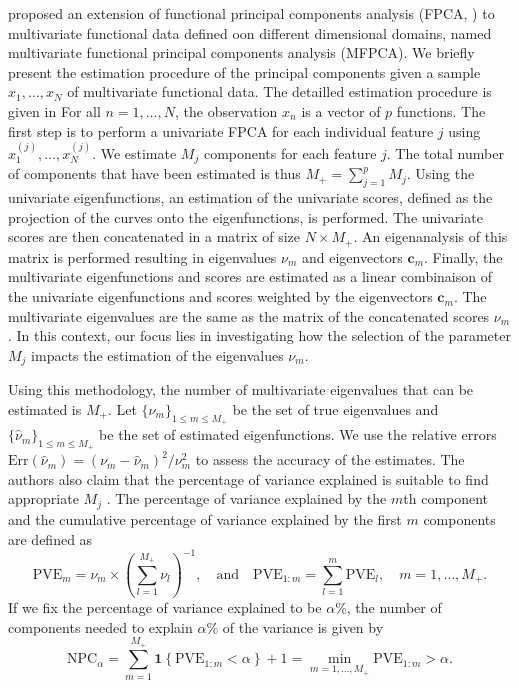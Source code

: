 \cite{happMultivariateFunctionalPrincipal2018} proposed an extension of functional principal components analysis (FPCA, \cite{ramsayFunctionalDataAnalysis2005}) to multivariate functional data defined oon different dimensional domains, named multivariate functional principal components analysis (MFPCA). We briefly present the estimation procedure of the principal components given a sample $x_1, \dots, x_N$ of multivariate functional data. The detailled estimation procedure is given in \cite[Section 3]{happMultivariateFunctionalPrincipal2018} For all $n = 1, \dots, N$, the observation $x_n$ is a vector of $p$ functions. The first step is to perform a univariate FPCA for each individual feature $j$ using $x_1^{(j)}, \dots, x_N^{(j)}$. We estimate $M_j$ components for each feature $j$. The total number of components that have been estimated is thus $M_+ = \sum_{j = 1}^p M_j$. Using the univariate eigenfunctions, an estimation of the univariate scores, defined as the projection of the curves onto the eigenfunctions, is performed. The univariate scores are then concatenated in a matrix of size $N \times M_+$. An eigenanalysis of this matrix is performed resulting in eigenvalues $\nu_m$ and eigenvectors $\mathbf{c}_m$. Finally, the multivariate eigenfunctions and scores are estimated as a linear combinaison of the univariate eigenfunctions and scores weighted by the eigenvectors $\mathbf{c}_m$. The multivariate eigenvalues are the same as the matrix of the concatenated scores $\nu_m$. In this context, our focus lies in investigating how the selection of the parameter $M_j$ impacts the estimation of the eigenvalues $\nu_m$.

Using this methodology, the number of multivariate eigenvalues that can be estimated is $M_+$. Let $\{\nu_m\}_{1 \leq m \leq M_+}$ be the set of true eigenvalues and $\{\widehat{\nu}_m\}_{1 \leq m \leq M_+}$ be the set of estimated eigenfunctions. We use the relative errors $\text{Err}(\widehat{\nu}_m)  = (\nu_m - \widehat{\nu}_m)^2 / \nu^2_m$ to assess the accuracy of the estimates. The authors also claim that the percentage of variance explained is suitable to find appropriate $M_j$ \cite[Chapter 8.2]{ramsayFunctionalDataAnalysis2005}. The percentage of variance explained by the $m$th component and the cumulative percentage of variance explained by the first $m$ components are defined as
\begin{equation}\label{eq:pve}
     \text{PVE}_m = \nu_m \times \left(\sum_{l = 1}^{M_+} \nu_l\right)^{-1}, \quad\text{and}\quad \text{PVE}_{1:m} = \sum_{l = 1}^m \text{PVE}_l, \quad m = 1, \dots, M_+.
\end{equation}
If we fix the percentage of variance explained to be $\alpha\%$, the number of components needed to explain $\alpha\%$ of the variance is given by
\begin{equation}\label{eq:npc}
     \text{NPC}_{\alpha} = \sum_{m = 1}^{M_{+}} \mathbf{1}\left\{\text{PVE}_{1:m} < \alpha\right\} + 1 = \min_{m = 1, \dots, M_+} \text{PVE}_{1:m} > \alpha.
\end{equation}


